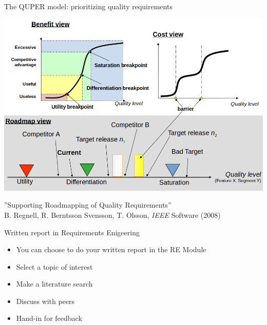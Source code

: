 \documentclass{beamer}
\begin{document}
\begin{frame}[fragile]{The QUPER model: prioritizing quality requirements}
\begin{center}
\includegraphics[width=1.0\textwidth]{img/quper}
\end{center}
{\footnotesize ''Supporting Roadmapping of Quality Requirements'' 
\\ B. Regnell, R. Berntsson Svensson, T. Olsson, \emph{IEEE} Software (2008)}
\end{frame}
  

\begin{frame}[fragile]{Written report in Requirements Enigeering}
\begin{itemize}
\item You can choose to do your written report in the RE Module
\item Select a topic of interest
\item Make a literature search
\item Discuss with peers
\item Hand-in for feedback
\end{itemize}
\end{frame}
\end{document}
